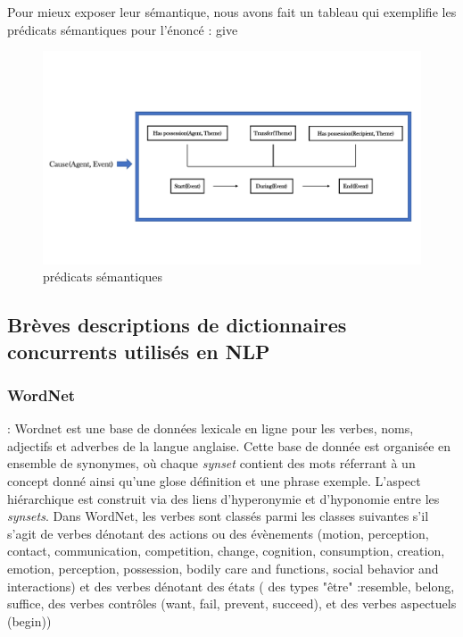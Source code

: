 Pour mieux exposer leur sémantique, nous avons fait un tableau qui exemplifie les prédicats sémantiques pour l'énoncé : give
\begin{figure}[h]
	\centering
	\includegraphics[width=1\textwidth, trim = {0cm 2cm 0cm 2cm},clip]{ch2/figs/semantics_give.pdf}
	\caption{prédicats sémantiques}
	\label{fig:Prédicat}
\end{figure}

\subsection{Brèves descriptions de dictionnaires concurrents utilisés en NLP}

\subsubsection{WordNet} : Wordnet est une base de données lexicale en ligne pour les verbes, noms, adjectifs et adverbes de la langue anglaise. Cette base de donnée est organisée en ensemble de synonymes, où chaque \emph{synset} contient des mots réferrant à un concept donné ainsi qu'une glose définition et une phrase exemple. L'aspect hiérarchique est construit via des liens d'hyperonymie et d'hyponomie entre les \emph{synsets}. Dans WordNet, les verbes sont classés parmi les classes suivantes s'il s'agit de verbes dénotant des actions ou des évènements (motion, perception, contact, communication, competition, change, cognition, consumption, creation, emotion, perception, possession, bodily care and functions, social behavior and interactions) et des verbes dénotant des états ( des types "être" :resemble, belong, suffice, des verbes contrôles (want, fail, prevent, succeed), et des verbes aspectuels (begin)) \citep{SchulerVerbnetBroadcoverageComprehensive2005}

